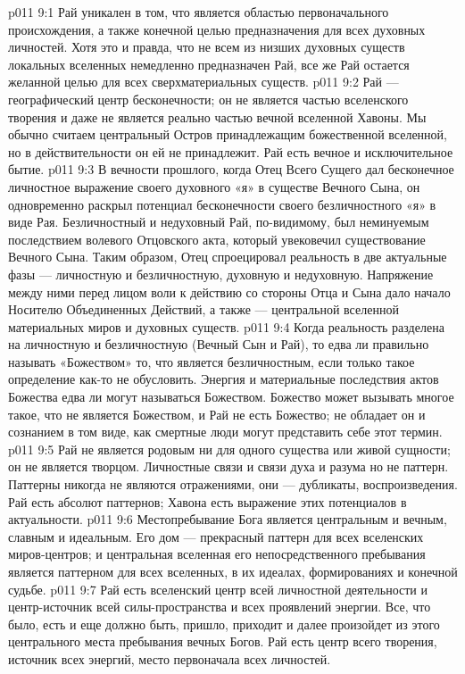 \vs p011 9:1 Рай уникален в том, что является областью первоначального происхождения, а также конечной целью предназначения для всех духовных личностей. Хотя это и правда, что не всем из низших духовных существ локальных вселенных немедленно предназначен Рай, все же Рай остается желанной целью для всех сверхматериальных существ.
\vs p011 9:2 \pc Рай --- географический центр бесконечности; он не является частью вселенского творения и даже не является реально частью вечной вселенной Хавоны. Мы обычно считаем центральный Остров принадлежащим божественной вселенной, но в действительности он ей не принадлежит. Рай есть вечное и исключительное бытие.
\vs p011 9:3 \pc В вечности прошлого, когда Отец Всего Сущего дал бесконечное личностное выражение своего духовного «я» в существе Вечного Сына, он одновременно раскрыл потенциал бесконечности своего безличностного «я» в виде Рая. Безличностный и недуховный Рай, по\hyp{}видимому, был неминуемым последствием волевого Отцовского акта, который увековечил существование Вечного Сына. Таким образом, Отец спроецировал реальность в две актуальные фазы --- личностную и безличностную, духовную и недуховную. Напряжение между ними перед лицом воли к действию со стороны Отца и Сына дало начало Носителю Объединенных Действий, а также --- центральной вселенной материальных миров и духовных существ.
\vs p011 9:4 Когда реальность разделена на личностную и безличностную (Вечный Сын и Рай), то едва ли правильно называть «Божеством» то, что является безличностным, если только такое определение как\hyp{}то не обусловить. Энергия и материальные последствия актов Божества едва ли могут называться Божеством. Божество может вызывать многое такое, что не является Божеством, и Рай не есть Божество; не обладает он и сознанием в том виде, как смертные люди могут представить себе этот термин.
\vs p011 9:5 \pc Рай не является родовым ни для одного существа или живой сущности; он не является творцом. Личностные связи и связи духа и разума  но не паттерн. Паттерны никогда не являются отражениями, они --- дубликаты, воспроизведения. Рай есть абсолют паттернов; Хавона есть выражение этих потенциалов в актуальности.
\vs p011 9:6 \pc Местопребывание Бога является центральным и вечным, славным и идеальным. Его дом --- прекрасный паттерн для всех вселенских миров\hyp{}центров; и центральная вселенная его непосредственного пребывания является паттерном для всех вселенных, в их идеалах, формированиях и конечной судьбе.
\vs p011 9:7 Рай есть вселенский центр всей личностной деятельности и центр\hyp{}источник всей силы\hyp{}пространства и всех проявлений энергии. Все, что было, есть и еще должно быть, пришло, приходит и далее произойдет из этого центрального места пребывания вечных Богов. Рай есть центр всего творения, источник всех энергий, место первоначала всех личностей.
